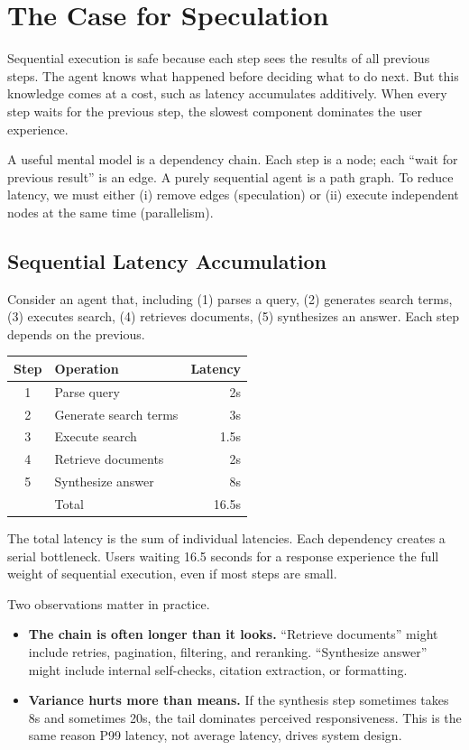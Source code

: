 \section{The Case for Speculation}

Sequential execution is safe because each step sees the results of all previous steps. The agent knows what happened before deciding what to do next. But this knowledge comes at a cost, such as latency accumulates additively. When every step waits for the previous step, the slowest component dominates the user experience.

A useful mental model is a dependency chain. Each step is a node; each ``wait for previous result'' is an edge. A purely sequential agent is a path graph. To reduce latency, we must either (i) remove edges (speculation) or (ii) execute independent nodes at the same time (parallelism).

\subsection{Sequential Latency Accumulation}

Consider an agent that, including (1) parses a query, (2) generates search terms, (3) executes search, (4) retrieves documents, (5) synthesizes an answer. Each step depends on the previous.

\begin{center}
\begin{tabular}{clr}
\toprule
Step & Operation & Latency \\
\midrule
1 & Parse query & 2s \\
2 & Generate search terms & 3s \\
3 & Execute search & 1.5s \\
4 & Retrieve documents & 2s \\
5 & Synthesize answer & 8s \\
\midrule
& Total & 16.5s \\
\bottomrule
\end{tabular}
\end{center}

The total latency is the sum of individual latencies. Each dependency creates a serial bottleneck. Users waiting 16.5 seconds for a response experience the full weight of sequential execution, even if most steps are small.

Two observations matter in practice.

\begin{itemize}
\item \textbf{The chain is often longer than it looks.} ``Retrieve documents'' might include retries, pagination, filtering, and reranking. ``Synthesize answer'' might include internal self-checks, citation extraction, or formatting.
\item \textbf{Variance hurts more than means.} If the synthesis step sometimes takes 8s and sometimes 20s, the tail dominates perceived responsiveness. This is the same reason P99 latency, not average latency, drives system design.
\end{itemize}

